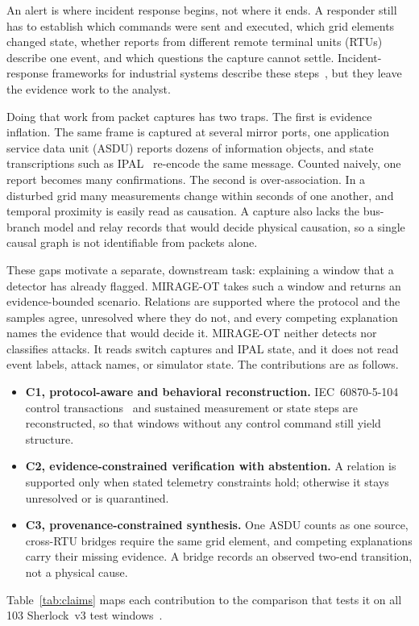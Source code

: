 \documentclass[conference]{IEEEtran}
\begin{document}
An alert is where incident response begins, not where it ends.
A responder still has to establish which commands were sent and executed, which grid elements changed state, whether reports from different remote terminal units (RTUs) describe one event, and which questions the capture cannot settle.
Incident-response frameworks for industrial systems describe these steps~\cite{smith2021air4ics,staves2022incidentresponse}, but they leave the evidence work to the analyst.

Doing that work from packet captures has two traps.
The first is evidence inflation.
The same frame is captured at several mirror ports, one application service data unit (ASDU) reports dozens of information objects, and state transcriptions such as IPAL~\cite{wolsing2022ipal} re-encode the same message.
Counted naively, one report becomes many confirmations.
The second is over-association.
In a disturbed grid many measurements change within seconds of one another, and temporal proximity is easily read as causation.
A capture also lacks the bus-branch model and relay records that would decide physical causation, so a single causal graph is not identifiable from packets alone.

These gaps motivate a separate, downstream task: explaining a window that a detector has already flagged.
MIRAGE-OT takes such a window and returns an evidence-bounded scenario.
Relations are supported where the protocol and the samples agree, unresolved where they do not, and every competing explanation names the evidence that would decide it.
MIRAGE-OT neither detects nor classifies attacks.
It reads switch captures and IPAL state, and it does not read event labels, attack names, or simulator state.
The contributions are as follows.
\begin{itemize}
\item \textbf{C1, protocol-aware and behavioral reconstruction.} IEC~60870-5-104 control transactions~\cite{iec60870} and sustained measurement or state steps are reconstructed, so that windows without any control command still yield structure.
\item \textbf{C2, evidence-constrained verification with abstention.} A relation is supported only when stated telemetry constraints hold; otherwise it stays unresolved or is quarantined.
\item \textbf{C3, provenance-constrained synthesis.} One ASDU counts as one source, cross-RTU bridges require the same grid element, and competing explanations carry their missing evidence. A bridge records an observed two-end transition, not a physical cause.
\end{itemize}
Table~\ref{tab:claims} maps each contribution to the comparison that tests it on all 103 Sherlock~v3 test windows~\cite{wagner2025sherlock,sherlockv3}.
\end{document}

